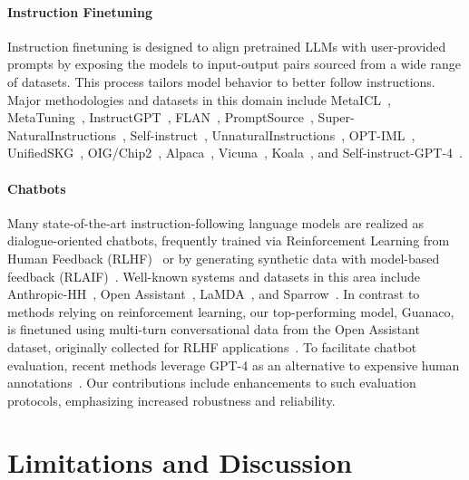 \paragraph{Instruction Finetuning} Instruction finetuning is designed to align pretrained LLMs with user-provided prompts by exposing the models to input-output pairs sourced from a wide range of datasets. This process tailors model behavior to better follow instructions. Major methodologies and datasets in this domain include MetaICL~\citep{min2021metaicl}, MetaTuning~\citep{zhong2021adapting}, InstructGPT~\citep{ouyang2022training}, FLAN~\citep{wei2021finetuned,chung2022scaling}, PromptSource~\citep{bach2022promptsource}, Super-NaturalInstructions~\citep{wang2022super,sanh2021multitask}, Self-instruct~\citep{wang2022self}, UnnaturalInstructions~\citep{honovich2022unnatural}, OPT-IML~\citep{iyer2022opt}, UnifiedSKG~\citep{xie2022unifiedskg}, OIG/Chip2~\citep{laion2023}, Alpaca~\citep{alpaca}, Vicuna~\citep{vicuna2023}, Koala~\citep{koala_blogpost_2023}, and Self-instruct-GPT-4~\citep{peng2023instruction}.

\paragraph{Chatbots} Many state-of-the-art instruction-following language models are realized as dialogue-oriented chatbots, frequently trained via Reinforcement Learning from Human Feedback (RLHF)~\citep{christiano2017deep} or by generating synthetic data with model-based feedback (RLAIF)~\citep{bai2022constitutional}. Well-known systems and datasets in this area include Anthropic-HH~\citep{askell2021general,bai2022training}, Open Assistant~\citep{kopf2023openassistant}, LaMDA~\citep{thoppilan2022lamda}, and Sparrow~\citep{glaese2022improving}. In contrast to methods relying on reinforcement learning, our top-performing model, Guanaco, is finetuned using multi-turn conversational data from the Open Assistant dataset, originally collected for RLHF applications~\citep{kopf2023openassistant}. To facilitate chatbot evaluation, recent methods leverage GPT-4 as an alternative to expensive human annotations~\citep{vicuna2023,peng2023instruction}. Our contributions include enhancements to such evaluation protocols, emphasizing increased robustness and reliability.

\section{Limitations and Discussion}

